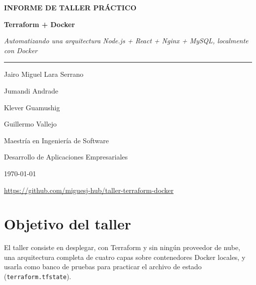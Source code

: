 \documentclass[11pt,a4paper]{article}
\begin{document}
\begin{titlepage}
\centering
\vspace*{3cm}

{\Large\bfseries\color{acento} INFORME DE TALLER PRÁCTICO\par}
\vspace{1cm}

{\Huge\bfseries Terraform + Docker\par}
\vspace{0.8cm}

{\large\itshape Automatizando una arquitectura Node.js + React + Nginx +
MySQL, localmente con Docker\par}

\vspace{2cm}
\rule{\linewidth}{0.4pt}
\vspace{0.6cm}

{\large Jairo Miguel Lara Serrano\par}
\vspace{0.4cm}
{\large Jumandi Andrade\par}
\vspace{0.4cm}
{\large Klever Guamushig\par}
\vspace{0.4cm}
{\large Guillermo Vallejo\par}
\vspace{1.2cm}
{Maestría en Ingeniería de Software\par}
\vspace{0.4cm}
{Desarrollo de Aplicaciones Empresariales\par}
\vspace{0.4cm}
\vfill
{\today\par}
\vspace{0.6cm}
{\small\url{https://github.com/miguesj-hub/taller-terraform-docker}\par}

\vfill
\end{titlepage}

\tableofcontents
\newpage

\section{Objetivo del taller}

El taller consiste en desplegar, con Terraform y sin ningún proveedor de
nube, una arquitectura completa de cuatro capas sobre contenedores Docker
locales, y usarla como banco de pruebas para practicar el archivo de
estado (\texttt{terraform.tfstate}).
\end{document}
